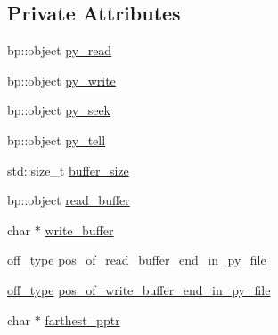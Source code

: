 \subsection*{Private Attributes}
\begin{DoxyCompactItemize}
\item 
bp\-::object \hyperlink{classecto_1_1py_1_1streambuf_a77a192df96e66a2e19cdfce078017df8}{py\-\_\-read}
\item 
bp\-::object \hyperlink{classecto_1_1py_1_1streambuf_aad739c2392d3c8f0de7d44719c7cc37a}{py\-\_\-write}
\item 
bp\-::object \hyperlink{classecto_1_1py_1_1streambuf_ad4e0dc91a74411d2181897d026ff945b}{py\-\_\-seek}
\item 
bp\-::object \hyperlink{classecto_1_1py_1_1streambuf_a3735b9e199be3e58c277354127a86146}{py\-\_\-tell}
\item 
std\-::size\-\_\-t \hyperlink{classecto_1_1py_1_1streambuf_a8d60fa297a9140474d136a48342ac850}{buffer\-\_\-size}
\item 
bp\-::object \hyperlink{classecto_1_1py_1_1streambuf_ac239012691e5d3485572159a53600005}{read\-\_\-buffer}
\item 
char $\ast$ \hyperlink{classecto_1_1py_1_1streambuf_a331e541fac616ac9ac3a81fb117057c6}{write\-\_\-buffer}
\item 
\hyperlink{classecto_1_1py_1_1streambuf_aa01772d1599fc51089a209a69fcab7c7}{off\-\_\-type} \hyperlink{classecto_1_1py_1_1streambuf_a7b219ca66aa176fdfbc9d6fb63d15cef}{pos\-\_\-of\-\_\-read\-\_\-buffer\-\_\-end\-\_\-in\-\_\-py\-\_\-file}
\item 
\hyperlink{classecto_1_1py_1_1streambuf_aa01772d1599fc51089a209a69fcab7c7}{off\-\_\-type} \hyperlink{classecto_1_1py_1_1streambuf_a1775b9bced7a5ff74fe30c788e20ad9e}{pos\-\_\-of\-\_\-write\-\_\-buffer\-\_\-end\-\_\-in\-\_\-py\-\_\-file}
\item 
char $\ast$ \hyperlink{classecto_1_1py_1_1streambuf_a8267e360cfb0201b1518a0dfd3d7c353}{farthest\-\_\-pptr}
\end{DoxyCompactItemize}


